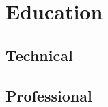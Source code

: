 \documentclass[]{deedy-resume}
\begin{document}
\begin{minipage}[t]{0.33\textwidth} 
  \section{Education} 
  
  \subsection{Technical}
  
  \subsection{Professional}
  

%
%

\end{minipage} 
\hfill
\end{document}
